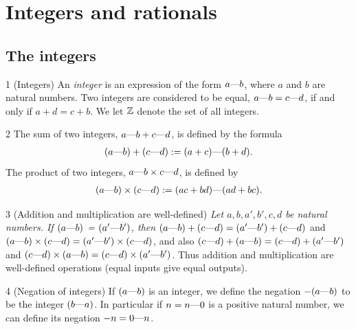 \section{Integers and rationals}\label{a1-ch4}
\subsection{The integers}
\begin{definition}{1}
    \label{integer}
    (Integers) An \emph{integer} is an expression of the form $a\text{\textemdash} b$, where $a$ and $b$ are natural numbers.
    Two integers are considered to be equal, $a\text{\textemdash} b=c\text{\textemdash} d$, if and only if $a+d=c+b$. We let $\mathbb{Z}$ denote
    the set of all integers.
\end{definition}

\begin{definition}{2}
    \label{int-add-mul}
    The sum of two integers, $a\text{\textemdash} b + c\text{\textemdash} d$, is defined by the formula
    \begin{align*}
        (a\text{\textemdash} b) + (c\text{\textemdash} d) := (a+c)\text{\textemdash}(b+d).
    \end{align*}
    The product of two integers, $a\text{\textemdash} b \times c\text{\textemdash} d$, is defined by
    \begin{align*}
        (a\text{\textemdash} b) \times (c\text{\textemdash} d) := (ac+bd)\text{\textemdash}(ad+bc).
    \end{align*}
\end{definition}

\begin{lemma}{3}
    \label{int-ops-well-defined}
    (Addition and multiplication are well-defined) \emph{Let $a, b, a', b', c, d$ be natural numbers.
    If $(a\text{\textemdash} b)$ = $(a'\text{\textemdash} b')$, then $(a\text{\textemdash} b) + (c\text{\textemdash} d) = (a'\text{\textemdash} b') + (c\text{\textemdash} d)$}
    and $(a\text{\textemdash} b) \times (c\text{\textemdash} d) = (a'\text{\textemdash} b') \times (c\text{\textemdash} d)$, and also
    $(c\text{\textemdash} d) + (a\text{\textemdash} b) = (c\text{\textemdash} d) + (a'\text{\textemdash} b')$ and
    $(c\text{\textemdash} d) \times (a\text{\textemdash} b) = (c\text{\textemdash} d) \times (a'\text{\textemdash} b')$.
    Thus addition and multiplication are well-defined operations (equal inputs give equal outputs).
\end{lemma}

\begin{definition}{4}
    \label{int-negation}
    (Negation of integers) If $(a\text{\textemdash} b)$ is an integer, we define the negation $-(a\text{\textemdash} b)$ to be the integer
    $(b\text{\textemdash} a)$.
    In particular if $n=n\text{\textemdash} 0$ is a positive natural number, we can define its negation $-n=0\text{\textemdash} n$.
\end{definition}

